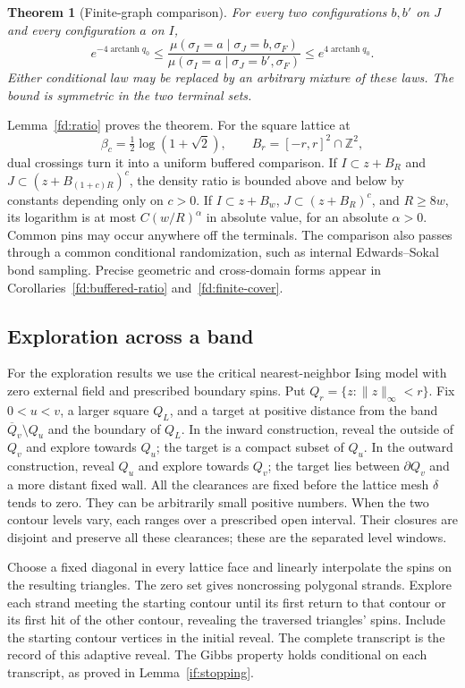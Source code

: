 \documentclass[11pt]{article}
\newtheorem{theorem}{Theorem}[section]
\theoremstyle{definition}
\theoremstyle{remark}
\numberwithin{equation}{section}
\begin{document}
\begin{theorem}[Finite-graph comparison]\label{in:comparison}
For every two configurations $b,b'$ on $J$ and every configuration $a$
on $I$,
\[
 e^{-4\operatorname{arctanh}q_0}
 \leq
 \frac{\mu(\sigma_I=a\mid\sigma_J=b,\sigma_F)}
      {\mu(\sigma_I=a\mid\sigma_J=b',\sigma_F)}
 \leq e^{4\operatorname{arctanh}q_0}.
\]
Either conditional law may be replaced by an arbitrary mixture of
these laws. The bound is symmetric in the two terminal sets.
\end{theorem}

Lemma~\ref{fd:ratio} proves the theorem. For the square lattice at
\[
 \beta_c=\tfrac12\log(1+\sqrt2),\qquad
 B_r=[-r,r]^2\cap\mathbb Z^2,
\]
dual crossings turn it into a uniform buffered comparison. If
$I\subset z+B_R$ and $J\subset(z+B_{(1+c)R})^c$, the density ratio
is bounded above and below by constants depending only on $c>0$.
If $I\subset z+B_w$, $J\subset(z+B_R)^c$, and $R\ge8w$, its
logarithm is at most $C(w/R)^\alpha$ in absolute value, for an
absolute $\alpha>0$. Common pins may occur anywhere off the terminals.
The comparison also passes through a common conditional randomization,
such as internal Edwards--Sokal bond sampling. Precise geometric and
cross-domain forms appear in Corollaries~\ref{fd:buffered-ratio}
and~\ref{fd:finite-cover}.

\subsection{Exploration across a band}
For the exploration results we use the critical nearest-neighbor Ising
model with zero external field and prescribed boundary spins.
Put $Q_r=\{z:\|z\|_\infty<r\}$. Fix $0<u<v$, a larger square
$Q_L$, and a target at positive distance from the band
$\overline Q_v\setminus Q_u$ and the boundary of $Q_L$.
In the inward construction, reveal the outside of $Q_v$ and explore
towards $Q_u$; the target is a compact subset of $Q_u$. In the outward
construction, reveal $Q_u$ and explore towards $Q_v$; the target lies
between $\partial Q_v$ and a more distant fixed wall. All the
clearances are fixed before the lattice mesh $\delta$ tends to zero.
They can be arbitrarily small positive numbers.
When the two contour levels vary, each ranges over a prescribed open
interval. Their closures are disjoint and preserve all these clearances;
these are the separated level windows.

Choose a fixed diagonal in every lattice face and linearly interpolate
the spins on the resulting triangles. The zero set gives noncrossing
polygonal strands. Explore each strand meeting the starting contour
until its first return to that contour or its first hit of the other
contour, revealing the traversed triangles' spins. Include the starting
contour vertices in the initial reveal. The complete transcript is the
record of this adaptive reveal. The Gibbs property holds conditional on
each transcript, as proved in Lemma~\ref{if:stopping}.
\end{document}
